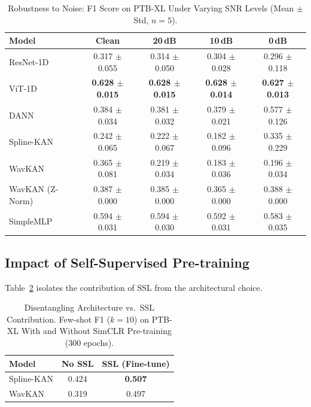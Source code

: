 \documentclass[journal,twoside,web]{ieeecolor}
\begin{document}
\begin{table}[!t]
\centering
\caption{Robustness to Noise: F1 Score on PTB-XL Under Varying SNR Levels (Mean $\pm$ Std, $n=5$).}
\label{tab:robustness}
\begin{tabular}{@{}lcccc@{}}
\toprule
\textbf{Model} & \textbf{Clean} & \textbf{20\,dB} & \textbf{10\,dB} & \textbf{0\,dB} \\
\midrule
ResNet-1D      & 0.317 $\pm$ 0.055 & 0.314 $\pm$ 0.050 & 0.304 $\pm$ 0.028 & 0.296 $\pm$ 0.118 \\
ViT-1D         & \textbf{0.628 $\pm$ 0.015} & \textbf{0.628 $\pm$ 0.015} & \textbf{0.628 $\pm$ 0.014} & \textbf{0.627 $\pm$ 0.013} \\
DANN           & 0.384 $\pm$ 0.034 & 0.381 $\pm$ 0.032 & 0.379 $\pm$ 0.021 & 0.577 $\pm$ 0.126 \\
Spline-KAN     & 0.242 $\pm$ 0.065 & 0.222 $\pm$ 0.067 & 0.182 $\pm$ 0.096 & 0.335 $\pm$ 0.229 \\
WavKAN         & 0.365 $\pm$ 0.081 & 0.219 $\pm$ 0.034 & 0.183 $\pm$ 0.036 & 0.196 $\pm$ 0.034 \\
WavKAN (Z-Norm)& 0.387 $\pm$ 0.000 & 0.385 $\pm$ 0.000 & 0.365 $\pm$ 0.000 & 0.388 $\pm$ 0.000 \\
SimpleMLP      & 0.594 $\pm$ 0.031 & 0.594 $\pm$ 0.030 & 0.592 $\pm$ 0.031 & 0.583 $\pm$ 0.035 \\
\bottomrule
\end{tabular}
\end{table}

\subsection{Impact of Self-Supervised Pre-training}

Table~\ref{tab:ssl} isolates the contribution of SSL from the architectural choice.

\begin{table}[!t]
\centering
\caption{Disentangling Architecture vs.\ SSL Contribution. Few-shot F1 ($k=10$) on PTB-XL With and Without SimCLR Pre-training (300 epochs).}
\label{tab:ssl}
\begin{tabular}{@{}lcc@{}}
\toprule
\textbf{Model} & \textbf{No SSL} & \textbf{SSL (Fine-tune)} \\
\midrule
Spline-KAN     & 0.424 & \textbf{0.507} \\
WavKAN         & 0.319 & 0.497 \\
\bottomrule
\end{tabular}
\end{table}
\end{document}
